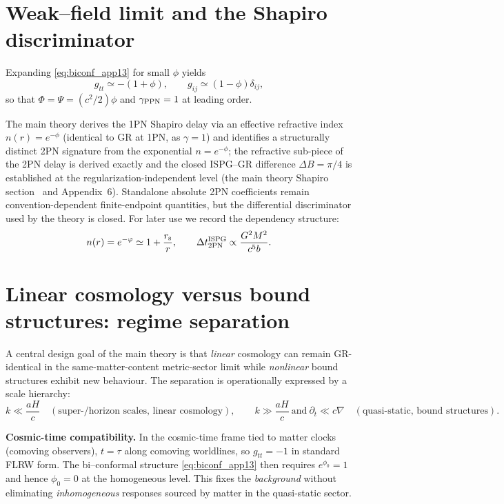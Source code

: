 \documentclass[11pt]{article}
\newcommand{\rs}{r_{\mathrm{s}}}
\begin{document}
\section{Weak--field limit and the Shapiro discriminator}\label{sec:ppn_app13}
Expanding \eqref{eq:biconf_app13} for small $\phi$ yields
\begin{equation}
g_{tt}\simeq -(1+\phi),\qquad g_{ij}\simeq (1-\phi)\delta_{ij},
\end{equation}
so that $\Phi=\Psi=(c^2/2)\phi$ and $\gamma_{\rm PPN}=1$ at leading order.

The main theory derives the 1PN Shapiro delay via an effective refractive index $n(r)=e^{-\phi}$ (identical to GR at 1PN, as $\gamma=1$) and identifies a structurally distinct 2PN signature from the exponential $n=e^{-\phi}$; the refractive sub-piece of the 2PN delay is derived exactly and the closed ISPG--GR difference $\Delta B = \pi/4$ is established at the regularization-independent level (the main theory Shapiro section~\cite{Lotishvili2026} and Appendix~6).  Standalone absolute 2PN coefficients remain convention-dependent finite-endpoint quantities, but the differential discriminator used by the theory is closed. For later use we record the dependency structure:
\begin{equation}
n(r)=e^{-\phi}\simeq 1+\frac{\rs}{r},\qquad
\Delta t_{2\rm PN}^{\rm ISPG}\propto \frac{G^2M^2}{c^5 b}.
\end{equation}

\section{Linear cosmology versus bound structures: regime separation}\label{sec:regime}
A central design goal of the main theory is that \emph{linear} cosmology can remain GR-identical in the same-matter-content metric-sector limit while \emph{nonlinear} bound structures exhibit new behaviour. The separation is operationally expressed by a scale hierarchy:
\begin{equation}
k \ll \frac{aH}{c}\quad (\text{super-/horizon scales, linear cosmology}),\qquad
k \gg \frac{aH}{c}\ \text{and}\ \partial_t \ll c\nabla\quad (\text{quasi-static, bound structures}).
\label{eq:scaleseparation}
\end{equation}

\textbf{Cosmic-time compatibility.}
In the cosmic-time frame tied to matter clocks (comoving observers), $t=\tau$ along comoving worldlines, so $g_{tt}=-1$ in standard FLRW form. The bi--conformal structure \eqref{eq:biconf_app13} then requires $e^{\phi_0}=1$ and hence $\phi_0=0$ at the homogeneous level. This fixes the \emph{background} without eliminating \emph{inhomogeneous} responses sourced by matter in the quasi-static sector.
\end{document}
